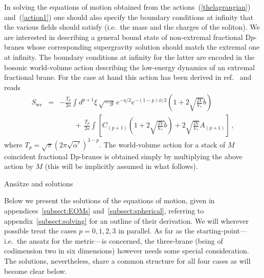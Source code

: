 \documentclass[a4paper,11pt]{article}
\makeatletter
\renewcommand{\subsection}{\@startsection{subsection}{2}{\z@} {-3.25ex
plus -1ex minus -.2ex}{1.5ex plus .2ex}{\normalsize\bf}}
\newcommand{\eqref}[1]{(\ref{#1})}
\makeatother
\begin{document}
In solving the equations of motion obtained from the
actions~\eqref{thelagrangian} and~\eqref{action1} one should also
specify the boundary conditions at infinity that the various fields
should satisfy (i.e.\ the mass and the charges of the soliton). We are
interested in describing a general bound state of non-extremal
fractional D$p$-branes whose corresponding supergravity solution
should match the extremal one at infinity. The boundary conditions at
infinity for the latter are encoded in the bosonic world-volume action
describing the low-energy dynamics of an extremal fractional
brane. For the case at hand this action has been derived in
ref.~\cite{Frau:2000gk} and reads
\begin{eqnarray}
\label{bac1}
S_{\mathrm{wv}} &=& - \frac{T_p}{2\kappa} \int d^{p+1}\xi \,
\sqrt{-g}\, e^{-\eta/2} e^{-(1-p)\phi/2} \left( 1 + 2 \sqrt{\frac{2
V}{V_*}} \tilde b \right) \nonumber \\[1ex] && \qquad +
\,\frac{T_p}{2\kappa} \int \left[ C_{(p+1)} \left( 1 + 2 \sqrt{\frac{2
V}{V_*}} \tilde b \right) + 2 \sqrt{\frac{2 V}{V_*}} A_{(p+1)} \right]
\,,
\end{eqnarray}
where $T_p=\sqrt{\pi} (2 \pi \sqrt{\alpha'})^{3-p}$. The world-volume
action for a stack of $M$ coincident fractional D$p$-branes is
obtained simply by multiplying the above action by $M$ (this will be
implicitly assumed in what follows).



\subsection{Ans\"atze and solutions}
\label{subsect:ansaetze}


Below we present the solutions of the equations of motion, given in
appendices~\ref{subsect:EOMs} and~\ref{subsect:spherical}, referring
to appendix~\ref{subsect:solving} for an outline of their derivation.
We will wherever possible treat the cases $p=0,1,2,3$ in parallel. As
far as the starting-point---i.e.\ the ansatz for the metric---is
concerned, the three-brane (being of codimension two in six dimensions)
however needs some special consideration. The solutions, nevertheless,
share a common structure for all four cases as will become clear below.
\end{document}
